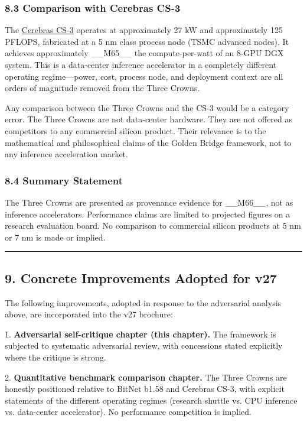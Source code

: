 \subsubsection{8.3 Comparison with Cerebras CS-3}

The \href{https://www.cerebras.ai/blog/cerebras-cs-3-vs-groq-lpu}{Cerebras CS-3} operates at approximately 27 kW and approximately 125 PFLOPS, fabricated at a 5 nm class process node (TSMC advanced nodes). It achieves approximately \_\_M65\_\_ the compute-per-watt of an 8-GPU DGX system. This is a data-center inference accelerator in a completely different operating regime---power, cost, process node, and deployment context are all orders of magnitude removed from the Three Crowns.

Any comparison between the Three Crowns and the CS-3 would be a category error. The Three Crowns are not data-center hardware. They are not offered as competitors to any commercial silicon product. Their relevance is to the mathematical and philosophical claims of the Golden Bridge framework, not to any inference acceleration market.

\subsubsection{8.4 Summary Statement}

The Three Crowns are presented as provenance evidence for \_\_M66\_\_, not as inference accelerators. Performance claims are limited to projected figures on a research evaluation board. No comparison to commercial silicon products at 5 nm or 7 nm is made or implied.

\noindent\rule{\textwidth}{0.4pt}

\subsection{9. Concrete Improvements Adopted for v27}

The following improvements, adopted in response to the adversarial analysis above, are incorporated into the v27 brochure:

1. \textbf{Adversarial self-critique chapter (this chapter).} The framework is subjected to systematic adversarial review, with concessions stated explicitly where the critique is strong.

2. \textbf{Quantitative benchmark comparison chapter.} The Three Crowns are honestly positioned relative to BitNet b1.58 and Cerebras CS-3, with explicit statements of the different operating regimes (research shuttle vs. CPU inference vs. data-center accelerator). No performance competition is implied.

